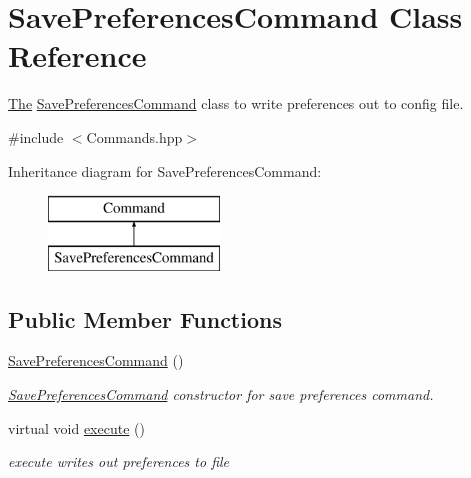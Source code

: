 \hypertarget{class_save_preferences_command}{}\section{Save\+Preferences\+Command Class Reference}
\label{class_save_preferences_command}


\hyperlink{namespace_the}{The} \hyperlink{class_save_preferences_command}{Save\+Preferences\+Command} class to write preferences out to config file.  




{\ttfamily \#include $<$Commands.\+hpp$>$}

Inheritance diagram for Save\+Preferences\+Command\+:\begin{figure}[H]
\begin{center}
\leavevmode
\includegraphics[height=2.000000cm]{class_save_preferences_command}
\end{center}
\end{figure}
\subsection*{Public Member Functions}
\begin{DoxyCompactItemize}
\item 
\hypertarget{class_save_preferences_command_aa7d106759983a4019e18da9d50c6e360}{}\hyperlink{class_save_preferences_command_aa7d106759983a4019e18da9d50c6e360}{Save\+Preferences\+Command} ()\label{class_save_preferences_command_aa7d106759983a4019e18da9d50c6e360}

\begin{DoxyCompactList}\small\item\em \hyperlink{class_save_preferences_command}{Save\+Preferences\+Command} constructor for save preferences command. \end{DoxyCompactList}\item 
\hypertarget{class_save_preferences_command_a7d71a14e5e1e868a44a9033862038af7}{}virtual void \hyperlink{class_save_preferences_command_a7d71a14e5e1e868a44a9033862038af7}{execute} ()\label{class_save_preferences_command_a7d71a14e5e1e868a44a9033862038af7}

\begin{DoxyCompactList}\small\item\em execute writes out preferences to file \end{DoxyCompactList}\end{DoxyCompactItemize}


